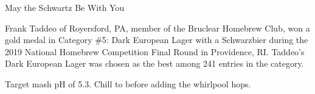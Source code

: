 \stylesection{\styleschwarzbier}

\begin{recipe}{May the Schwartz Be With You}

\begin{aboutblock}
Frank Taddeo of Royersford, PA, member of the Bruclear Homebrew Club, won a gold
medal in Category \#5: Dark European Lager with a Schwarzbier during the 2019
National Homebrew Competition Final Round in Providence, RI. Taddeo's Dark European
Lager was chosen as the best among 241 entries in the category. \sourceaha
\end{aboutblock}


\begin{methodandtiming}
 
\begin{mashsteps}
\end{mashsteps}

\begin{fermentationsteps}
\end{fermentationsteps}

\begin{directions}
Target mash pH of 5.3. Chill to  before adding the whirlpool hops.
\end{directions}

\end{methodandtiming}

\recipebreak

\begin{ingredientsblock}

\begin{malts}
\end{malts}

\begin{hops}
\end{hops}


\end{ingredientsblock}

\end{recipe}

